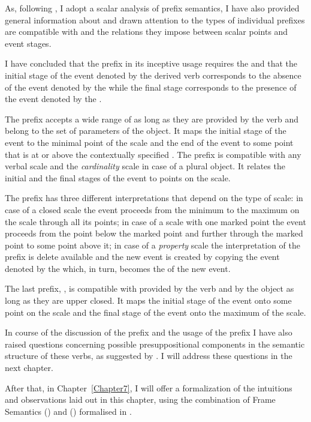 As, following \citet{Kagan:book}, I adopt a scalar analysis of prefix semantics, I have also provided general information about  and drawn attention to the types of  individual prefixes are compatible with and the relations they impose between scalar points and event stages. 

I have concluded that the prefix  in its inceptive usage requires the  and that the initial stage of the event denoted by the derived verb corresponds to the absence of the event denoted by the  while the final stage corresponds to the presence of the event denoted by the . 

The prefix  accepts a wide range of  as long as they are provided by the verb and belong to the set of parameters of the object. It maps the initial stage of the event to the minimal point of the scale and the end of the event to some point that is at or above the contextually specified . The prefix  is compatible with any verbal scale and the \textit{cardinality} scale in case of a plural object. It relates the initial and the final stages of the event to points on the scale. 

The prefix  has three different interpretations that depend on the type of scale: in case of a closed scale the event proceeds from the minimum to the maximum on the scale through all its points; in case of a scale with one marked point the event proceeds from the point below the marked point and further through the marked point to some point above it; in case of a \textit{property} scale the  interpretation of the prefix is delete available and the new event is created by copying the event denoted by the  which, in turn, becomes the  of the new event. 

The last prefix, , is compatible with  provided by the verb and by the object as long as they are upper closed. It maps the initial stage of the event onto some point on the scale and the final stage of the event onto the maximum of the scale. 

In course of the discussion of the prefix  and the  usage of the prefix  I have also raised questions concerning possible presuppositional components in the semantic structure of these verbs, as suggested by \citet{Kagan:book}. I will address these questions in the next chapter.

After that, in Chapter~\ref{Chapter7}, I will offer a formalization of the intuitions and observations laid out in this chapter, using the combination of Frame Semantics (\citealt{Fillmore:82}) and  (\citealt{JoshiSchabes:97}) formalised in \citealt{KallmeyerOsswald:13}. 

